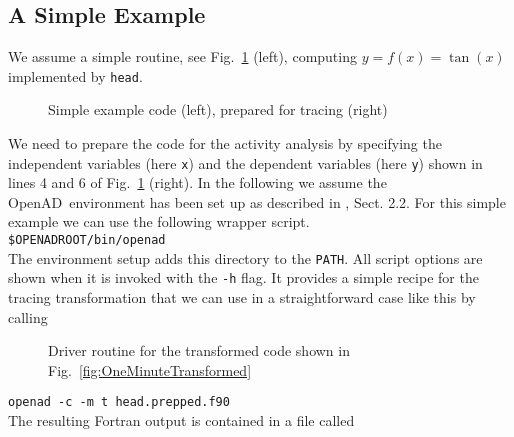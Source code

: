 \documentclass{article}
\newcommand{\openad}{OpenAD}
\newcommand{\reffig}[1]{{Fig.~\ref{#1}}}
\begin{document}
\subsection{A Simple Example}
We assume a simple routine, see \reffig{fig:OneMinute} (left), computing $y=f(x)=\tan(x)$ implemented by \lstinline{head}.
\begin{figure}
\begin{minipage}[t]{.48\linewidth}

\end{minipage}
\begin{minipage}[t]{.48\linewidth}

\end{minipage}
\caption{Simple example code (left), prepared for tracing (right)}\label{fig:OneMinute}
\end{figure}
We need to prepare the code for the activity analysis by specifying the independent variables
(here \lstinline{x}) and the dependent variables 
(here \lstinline{y}) shown in lines 4 and 6 of \reffig{fig:OneMinute} (right).
In the following we assume the \openad\ environment has been set up as 
described in \cite{userManual}, Sect. 2.2.
For this simple example we can use the following wrapper script.\\[1ex]
\hspace*{.3cm}\lstinline{$OPENADROOT/bin/openad}\\[1ex] %
The environment setup adds this directory to the \lstinline{PATH}.
All script options are shown when it is invoked with the \lstinline{-h} flag. 
It provides a simple recipe for the tracing transformation that we can use in 
a straightforward case like this by calling %
\begin{wrapfigure}[25]{r}{.5\textwidth}
\begin{minipage}{.98\linewidth}

\end{minipage}
\caption{Driver routine for the transformed code  shown in \reffig{fig:OneMinuteTransformed} }\label{fig:OneMinuteDriver}
\end{wrapfigure}
\hspace*{.3cm}\lstinline{openad -c -m t head.prepped.f90}\\[1ex]
The resulting Fortran output is contained in a file called\\[1ex]
\end{document}
